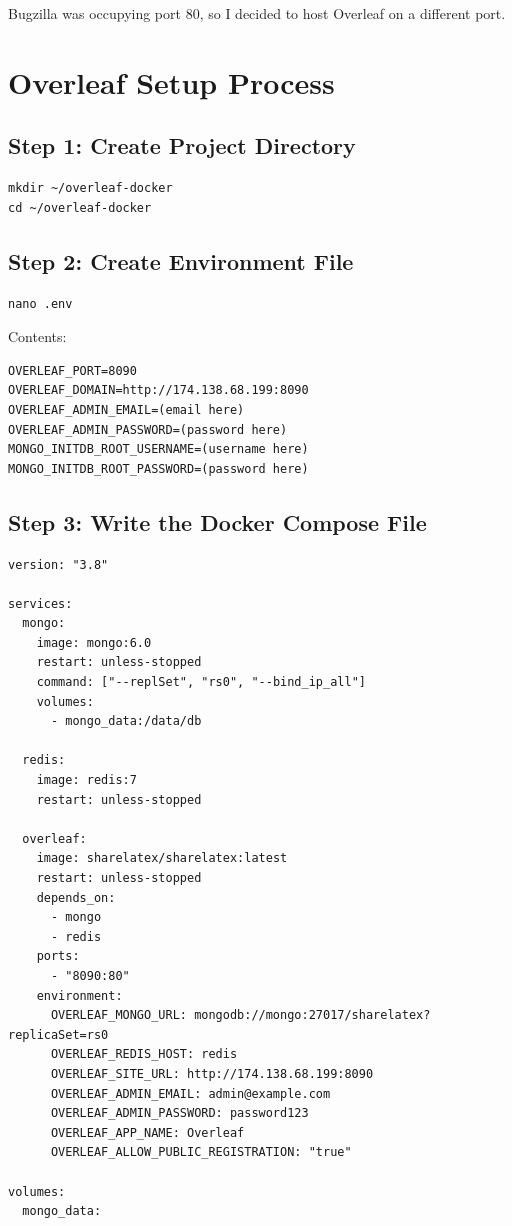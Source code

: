 Bugzilla was occupying port 80, so I decided to host Overleaf on a different port.

\section{Overleaf Setup Process}

\subsection{Step 1: Create Project Directory}
\begin{verbatim}
mkdir ~/overleaf-docker
cd ~/overleaf-docker
\end{verbatim}

\subsection{Step 2: Create Environment File}
\begin{verbatim}
nano .env
\end{verbatim}

Contents:
\begin{verbatim}
OVERLEAF_PORT=8090
OVERLEAF_DOMAIN=http://174.138.68.199:8090
OVERLEAF_ADMIN_EMAIL=(email here)
OVERLEAF_ADMIN_PASSWORD=(password here)
MONGO_INITDB_ROOT_USERNAME=(username here)
MONGO_INITDB_ROOT_PASSWORD=(password here)
\end{verbatim}

\subsection{Step 3: Write the Docker Compose File}
\begin{verbatim}
version: "3.8"

services:
  mongo:
    image: mongo:6.0
    restart: unless-stopped
    command: ["--replSet", "rs0", "--bind_ip_all"]
    volumes:
      - mongo_data:/data/db

  redis:
    image: redis:7
    restart: unless-stopped

  overleaf:
    image: sharelatex/sharelatex:latest
    restart: unless-stopped
    depends_on:
      - mongo
      - redis
    ports:
      - "8090:80"
    environment:
      OVERLEAF_MONGO_URL: mongodb://mongo:27017/sharelatex?replicaSet=rs0
      OVERLEAF_REDIS_HOST: redis
      OVERLEAF_SITE_URL: http://174.138.68.199:8090
      OVERLEAF_ADMIN_EMAIL: admin@example.com
      OVERLEAF_ADMIN_PASSWORD: password123
      OVERLEAF_APP_NAME: Overleaf
      OVERLEAF_ALLOW_PUBLIC_REGISTRATION: "true"

volumes:
  mongo_data:
\end{verbatim}



